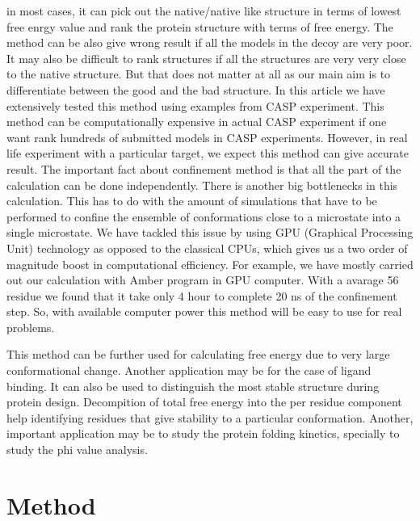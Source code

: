 \documentclass[12pt]{article}
\begin{document}
in most cases, it can pick out the native/native like structure in terms of lowest free enrgy value and rank the protein structure
with terms of free energy. 
The method can be also give wrong result if all the models in the decoy are very poor. It may also be difficult to rank structures if 
all the structures are very very close to the native structure. But that does not matter at all as our main aim is to differentiate
between the good and the bad structure. In this article we have extensively tested this method using examples from CASP experiment.
This method can be computationally expensive in actual CASP experiment if one want rank hundreds of submitted models in CASP 
experiments. However, in real life experiment with a particular target, we expect this method can give accurate result. The important 
fact about confinement method is that all the part of the calculation can be done independently. 
There is another big bottlenecks in this calculation. This has to do with the amount of
simulations that have to be performed to confine the ensemble of conformations close to a microstate
into a single microstate. We have tackled this issue by using GPU (Graphical Processing Unit) technology as opposed to the classical
CPUs, which gives us a two order of magnitude boost in computational efficiency.
For example, we have mostly carried out our calculation with Amber program \cite{Case2005} in GPU computer. With a avarage 56 residue 
we found that it take only 4 hour to complete 20 ns of the confinement step. So, with available computer power this method will 
be easy to use for real problems. 
 
This method can be further used for calculating free energy due to very large conformational change. Another application may be
for the case of ligand binding. It can also be used to distinguish the most stable structure during protein design. Decompition of 
total free energy into the per residue component help identifying residues that give stability to a particular conformation. 
Another, important application may be to study the protein folding kinetics, specially to study the phi value analysis.            


\section{Method}
\end{document}
